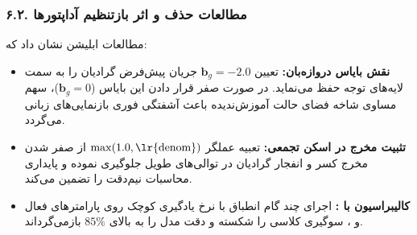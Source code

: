 \subsubsection*{۶.۲. مطالعات حذف و اثر بازتنظیم آداپتورها }
مطالعات ابلیشن نشان داد که:
\begin{itemize}
    \item \textbf{نقش بایاس دروازه‌بان:} تعیین $\mathbf{b}_g = -2.0$ جریان پیش‌فرض گرادیان را به سمت لایه‌های توجه حفظ می‌نماید. در صورت صفر قرار دادن این بایاس ($\mathbf{b}_g = 0$)، سهم مساوی شاخه فضای حالت آموزش‌ندیده باعث آشفتگی فوری بازنمایی‌های زبانی می‌گردد.
    \item \textbf{تثبیت مخرج در اسکن تجمعی:} تعبیه عملگر $\max(1.0, \text{\lr{denom}})$ از صفر شدن مخرج کسر و انفجار گرادیان در توالی‌های طویل جلوگیری نموده و پایداری محاسبات نیم‌دقت  را تضمین می‌کند.
    \item \textbf{کالیبراسیون با :} اجرای چند گام انطباق با نرخ یادگیری کوچک روی پارامترهای فعال  و ، سوگیری کلاسی را شکسته و دقت مدل را به بالای $85\%$ بازمی‌گرداند.
\end{itemize}

